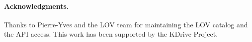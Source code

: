 \documentclass{sig-alternate}
\begin{document}

%



\vspace{1mm}
\paragraph{\textbf{Acknowledgments.}} %
Thanks to Pierre-Yves and the LOV team for maintaining the LOV catalog and the API access. This work has been supported by the KDrive Project.



\balancecolumns
\end{document}
